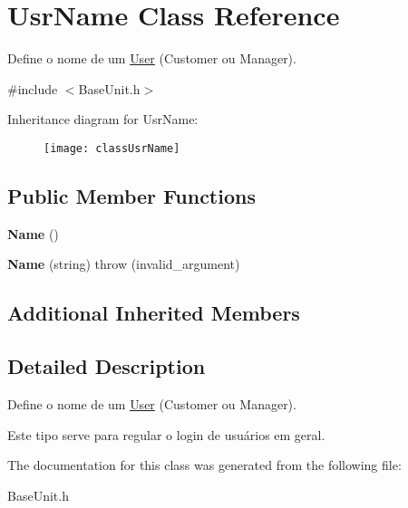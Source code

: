 \hypertarget{classUsrName}{\section{Usr\-Name Class Reference}
\label{classUsrName}
}


Define o nome de um \hyperlink{classUser}{User} (Customer ou Manager).  




{\ttfamily \#include $<$Base\-Unit.\-h$>$}

Inheritance diagram for Usr\-Name\-:\begin{figure}[H]
\begin{center}
\leavevmode
\texttt{[image: classUsrName]}
\end{center}
\end{figure}
\subsection*{Public Member Functions}
\begin{DoxyCompactItemize}
\item 
\hypertarget{classUsrName_a1b08302bcdce4624efc4283717bf0156}{{\bfseries Name} ()}\label{classUsrName_a1b08302bcdce4624efc4283717bf0156}

\item 
\hypertarget{classUsrName_aa28a3613ce9157f86f56cd038d288df2}{{\bfseries Name} (string)  throw (invalid\-\_\-argument)}\label{classUsrName_aa28a3613ce9157f86f56cd038d288df2}

\end{DoxyCompactItemize}
\subsection*{Additional Inherited Members}


\subsection{Detailed Description}
Define o nome de um \hyperlink{classUser}{User} (Customer ou Manager). 

Este tipo serve para regular o login de usuários em geral. 

The documentation for this class was generated from the following file\-:\begin{DoxyCompactItemize}
\item 
Base\-Unit.\-h\end{DoxyCompactItemize}
